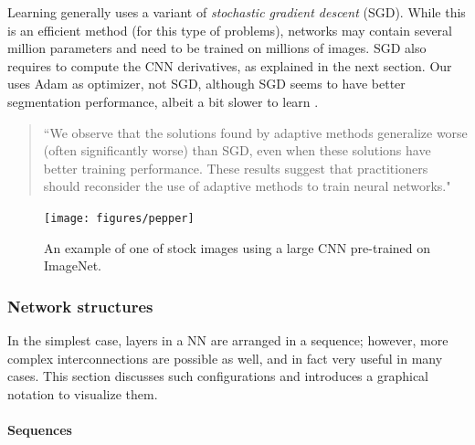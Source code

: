 Learning generally uses a variant of \emph{stochastic gradient descent} (SGD). While this is an efficient method (for this type of problems), networks may contain several million parameters and need to be trained on millions of images. SGD also requires to compute the CNN derivatives, as explained in the next section. Our \maskrcnn uses Adam as optimizer, not SGD, although SGD seems to have better segmentation performance, albeit a bit slower to learn \cite{wilson2017marginal}.
\begin{quotation}“We observe that the solutions found by adaptive methods generalize worse (often significantly worse) than SGD, even when these solutions have better training performance. These results suggest that practitioners should reconsider the use of adaptive methods to train neural networks."
\end{quotation}

\begin{figure}[H]
	\centering
	\texttt{[image: figures/pepper]}
	\caption{An example of one of  \matlab stock images using a large CNN pre-trained on ImageNet.}
	\label{f:demo}
\end{figure}

\subsubsection{Network structures}\label{s:cnn-topology}

In the simplest case, layers in a NN are arranged in a sequence; however, more complex interconnections are possible as well, and in fact very useful in many cases. This section discusses such configurations and introduces a graphical notation to visualize them.

\paragraph{Sequences}\label{s:cnn-simple}


